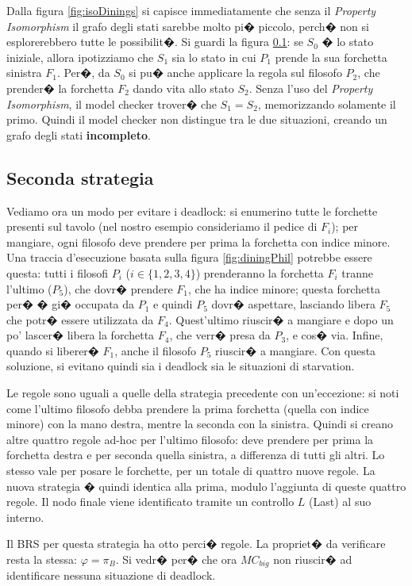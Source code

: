 Dalla figura \ref{fig:isoDinings} si capisce immediatamente che senza il \emph{Property Isomorphism} il grafo degli stati sarebbe molto pi� piccolo, perch� non si esplorerebbero tutte le possibilit�. Si guardi la figura \ref{}: se $S_0$ � lo stato iniziale, allora ipotizziamo che $S_1$ sia lo stato in cui $P_1$ prende la sua forchetta sinistra $F_1$. Per�, da $S_0$ si pu� anche applicare la regola sul filosofo $P_2$, che prender� la forchetta $F_2$ dando vita allo stato $S_2$. Senza l'uso del \emph{Property Isomorphism}, il model checker trover� che $S_1 = S_2$, memorizzando solamente il primo. Quindi il model checker non distingue tra le due situazioni, creando un grafo degli stati \textbf{incompleto}.


\subsection{Seconda strategia}
Vediamo ora un modo per evitare i deadlock: si enumerino tutte le forchette presenti sul tavolo (nel nostro esempio consideriamo il pedice di $F_i$); per mangiare, ogni filosofo deve prendere per prima la forchetta con indice minore. Una traccia d'esecuzione basata sulla figura \ref{fig:diningPhil} potrebbe essere questa: tutti i filosofi $P_i$ ($i \in \{1,2,3,4\}$) prenderanno la forchetta $F_i$ tranne l'ultimo ($P_5$), che dovr� prendere $F_1$, che ha indice minore; questa forchetta per� � gi� occupata da $P_1$ e quindi $P_5$ dovr� aspettare, lasciando libera $F_5$ che potr� essere utilizzata da $F_4$. Quest'ultimo riuscir� a mangiare e dopo un po' lascer� libera la forchetta $F_4$, che verr� presa da $P_3$, e cos� via. Infine, quando si liberer� $F_1$, anche il filosofo $P_5$ riuscir� a mangiare. Con questa soluzione, si evitano quindi sia i deadlock sia le situazioni di starvation.

Le regole sono uguali a quelle della strategia precedente con un'eccezione: si noti come l'ultimo filosofo debba prendere la prima forchetta (quella con indice minore) con la mano destra, mentre la seconda con la sinistra. Quindi si creano altre quattro regole ad-hoc per l'ultimo filosofo: deve prendere per prima la forchetta destra e per seconda quella sinistra, a differenza di tutti gli altri. Lo stesso vale per posare le forchette, per un totale di quattro nuove regole. La nuova strategia � quindi identica alla prima, modulo l'aggiunta di queste quattro regole. Il nodo finale viene identificato tramite un controllo $L$ (Last) al suo interno.

Il BRS per questa strategia ha otto perci� regole. La propriet� da verificare resta la stessa: $\varphi = \pi_B$. Si vedr� per� che ora $MC_{big}$ non riuscir� ad identificare nessuna situazione di deadlock. 

